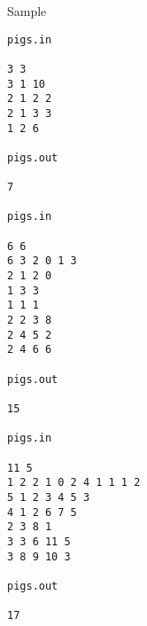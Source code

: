 Sample
\begin{verbatim}
pigs.in 
 
3 3 
3 1 10 
2 1 2 2 
2 1 3 3 
1 2 6 
 
pigs.out
 
7 

pigs.in 
 
6 6 
6 3 2 0 1 3 
2 1 2 0 
1 3 3 
1 1 1 
2 2 3 8 
2 4 5 2 
2 4 6 6 
 
pigs.out 
 
15 

pigs.in 
 
11 5 
1 2 2 1 0 2 4 1 1 1 2 
5 1 2 3 4 5 3 
4 1 2 6 7 5 
2 3 8 1 
3 3 6 11 5 
3 8 9 10 3 
 
pigs.out 
 
17  

\end{verbatim}